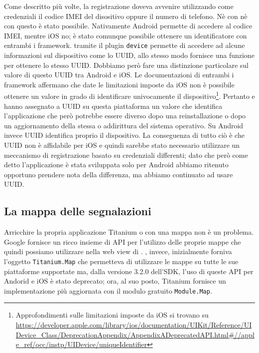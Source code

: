 			Come descritto più volte, la registrazione doveva avvenire utilizzando 
			come credenziali il codice IMEI del disositivo oppure il numero di telefono.
			Nè con \pg{} nè con \tisdk{} questo è stato possibile. Nativamente 
			Android permette di accedere al codice IMEI, mentre iOS no; è stato 
			comunque possibile ottenere un identificatore con entrambi i 
			framework. \pg{} tramite il plugin \texttt{device} permette di accedere 
			ad alcune informazioni sul dispositivo come lo UUID, allo stesso 
			modo \tisdk{} fornisce una funzione per ottenere lo stesso UUID.
			Dobbiamo però fare una distinzione particolare sul valore di questo 
			UUID tra Android e iOS. 
			Le documentazioni di entrambi i framework affermano che date le limitazioni 
			imposte da iOS non è possibile ottenere un valore in grado di identificare 
			univocamente il dispositivo\footnote{Approfondimenti sulle limitazioni 
			imposte da iOS si trovano su \url{https://developer.apple.com/library/ios/documentation/UIKit/Reference/UIDevice_Class/DeprecationAppendix/AppendixADeprecatedAPI.html\#//apple_ref/occ/instp/UIDevice/uniqueIdentifier}}. 
			Pertanto \pg{} e \tisdk{} hanno assegnato a UUID su questa piattaforma 
			un valore che identifica l'applicazione che però potrebbe essere diverso 
			dopo una reinstallazione o dopo 
			un aggiornamento della stessa o addirittura del sistema operativo. 
			Su Android invece UUID 
			identifica proprio il dispositivo. La conseguenza di tutto ciò è che 
			UUID non è affidabile per iOS e quindi sarebbe stato necessario utilizzare 
			un meccanismo di registrazione basato su credenziali differenti; 
			dato che però come detto l'applicazione è stata sviluppata solo per Android 
			abbiamo ritenuto opportuno prendere nota della differenza, ma abbiamo 
			continuato ad usare UUID.
		\subsection{La mappa delle segnalazioni}
			Arricchire la propria applicazione Titanium o \pg{} con una mappa
			non è un problema. Google fornisce un ricco insieme di API \js{} per
			l'utilizzo delle proprie mappe che quindi possiamo utilizzare nella
			web view di \pg{}. \tisdk, invece, inizialmente forniva l'oggetto
			\texttt{Titanium.Map} che permetteva di utilizzare le mappe su tutte
			le sue piattaforme supportate ma, dalla versione 3.2.0 dell'SDK, l'uso
			di queste API per Andorid e iOS è stato deprecato; ora, al suo posto,
			Titanium fornisce un implementazione più aggiornata con	il modulo
			gratuito \texttt{Module.Map}.
			
